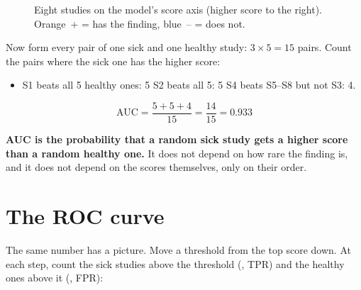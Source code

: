 \begin{figure}[H]
\centering
{}
\caption{Eight studies on the model's score axis (higher score to the right). Orange~+ = has the finding,
blue~-- = does not.}
\label{fig:rankgame}
\end{figure}

Now form every pair of one sick and one healthy study: $3 \times 5 = 15$ pairs. Count the pairs where the sick one
has the higher score:
\begin{itemize}
\item S1 beats all 5 healthy ones: 5 \quad S2 beats all 5: 5 \quad S4 beats S5--S8 but not S3: 4.
\end{itemize}
\[
\text{AUC} = \frac{5+5+4}{15} = \frac{14}{15} = 0.933
\]

\begin{keyidea}
\textbf{AUC is the probability that a random sick study gets a higher score than a random healthy one.}
It does not depend on how rare the finding is, and it does not depend on the scores themselves, only on
their order.
\end{keyidea}

\section{The ROC curve}

The same number has a picture. Move a threshold from the top score down. At each step, count the sick studies above
the threshold (, TPR) and the healthy ones above it (, FPR):

